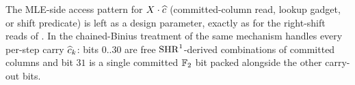 The MLE-side access pattern for $X\cdot\widehat{c}$ (committed-column read,
lookup gadget, or shift predicate) is left as a design parameter,
exactly as for the right-shift reads of . In
the chained-Binius treatment of  the same
mechanism handles every per-step carry $\widehat{c}_k$: bits $0..30$ are
free $\operatorname{SHR}^{1}$-derived combinations of committed columns and bit
$31$ is a single committed $\mathbb{F}_2$ bit packed alongside the other
carry-out bits.
